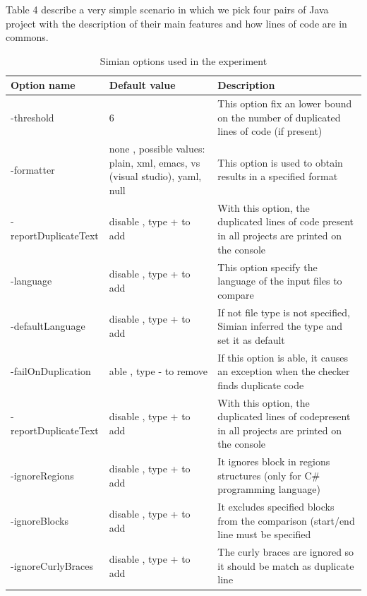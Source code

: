 Table 4 describe a very simple scenario in which we pick four pairs of Java project with the description of their main features and how lines of code are in commons.

\begin{center}
\begin{table}[H]
  \caption{ Simian options used in the experiment }
  \label{Table:3}
\begin{adjustbox}{width=1\textwidth}
\small
\begin{tabular}{|l|p{4cm}|p{6cm}|}

\hline

 \textbf{Option name} & \textbf{Default value} & \textbf{Description} \\
\hline
 -threshold & 6 &This option fix an lower bound on the number   of duplicated lines of code (if present)  \\
\hline
-formatter &  none , possible values: plain, xml, emacs,    vs (visual studio), yaml, null &   This option is used to obtain results in a specified format\\
\hline
-reportDuplicateText & disable , type + to add &   With this option, the duplicated lines of code  present in all projects are printed on the console    \\
\hline
-language & disable , type + to add &  This option specify the  language of the input files to compare   \\
\hline
-defaultLanguage & disable , type + to add &   If not file type is not specified, Simian inferred the type and set it as default    \\
\hline
-failOnDuplication & able , type - to remove & If this option is able, it causes  an exception when the checker finds duplicate code     \\
\hline
-reportDuplicateText & disable , type + to add & With this option, the duplicated lines of codepresent in all projects are printed on the console    \\
\hline
-ignoreRegions & disable , type + to add & It ignores block in regions structures (only for C\# programming language)  \\
\hline
-ignoreBlocks & disable , type + to add &  It excludes specified blocks  from the comparison (start/end line must be specified  \\
\hline
-ignoreCurlyBraces & disable , type + to add & The curly braces are ignored  so it should be match as duplicate line \\


\end{tabular}
\end{adjustbox}
\end{table}
\end{center}
